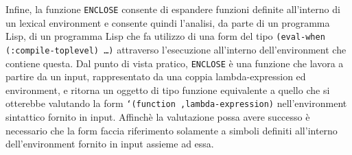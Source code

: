 Infine, la funzione \texttt{ENCLOSE} consente di espandere funzioni definite
all’interno di un lexical environment e consente quindi l’analisi, da parte di
un programma Lisp, di un programma Lisp che fa utilizzo di una form del tipo
\texttt{(eval-when (:compile-toplevel) …)} attraverso l’esecuzione all’interno
dell’environment che contiene questa. Dal punto di vista pratico,
\texttt{ENCLOSE} è una funzione che lavora a partire da un input,
rappresentato da una coppia lambda-expression ed environment, e ritorna un
oggetto di tipo funzione equivalente a quello che si otterebbe valutando la
form \texttt{`(function ,lambda-expression)} nell'environment sintattico
fornito in input. Affinchè la valutazione possa avere successo è necessario
che la form faccia riferimento solamente a simboli definiti all'interno
dell'environment fornito in input assieme ad essa.
